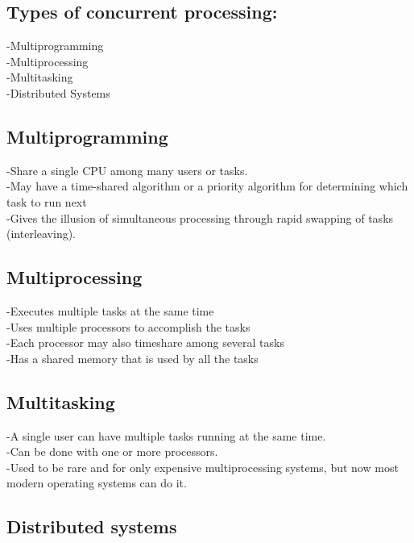 \subsection{Types of concurrent processing:}
-Multiprogramming\\
-Multiprocessing\\
-Multitasking\\
-Distributed Systems\\

\subsection{Multiprogramming}





-Share a single CPU among many users or tasks.\\
-May have a time-shared algorithm or a priority algorithm for determining which task to run next\\
-Gives the illusion of simultaneous processing through rapid swapping of tasks (interleaving).

\subsection{Multiprocessing}

-Executes multiple tasks at the same time\\
-Uses multiple processors to accomplish the tasks\\
-Each processor may also timeshare among several tasks\\
-Has a shared memory that is
used by all the tasks

\subsection{Multitasking}

-A single user can have
multiple tasks running at the
same time.\\
-Can be done with one or
more processors.\\
-Used to be rare and for only
expensive multiprocessing
systems, but now most
modern operating systems
can do it.\\

\subsection{Distributed systems}

